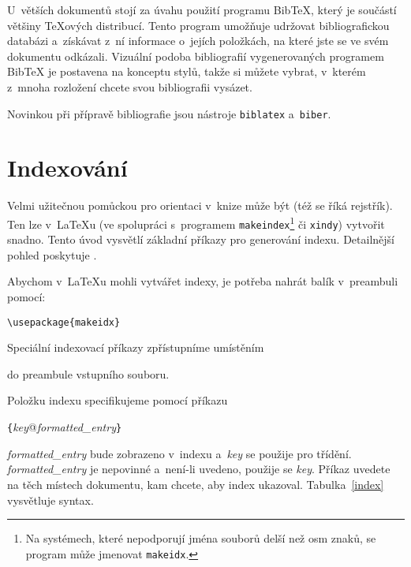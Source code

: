 \def\bibtex{Bib\TeX}
U~větších dokumentů stojí za úvahu použití programu \bibtex, který
je součástí většiny \TeX ových distribucí. Tento program umožňuje
udržovat bibliografickou databázi a~získávat z~ní informace
o~jejích položkách, na které jste se ve svém dokumentu odkázali.
Vizuální podoba bibliografií vygenerovaných programem \bibtex{}
je postavena na konceptu stylů, takže si můžete vybrat, v~kterém
z~mnoha rozložení chcete svou bibliografii vysázet.

Novinkou při přípravě bibliografie jsou nástroje \texttt{biblatex} a~\texttt{biber}.

\newpage

\section{Indexování} \label{sec:indexing}
Velmi užitečnou pomůckou pro orientaci v~knize může být  (též se říká rejstřík).
Ten lze v~\LaTeX u (ve spolupráci s~programem \texttt{makeindex}\footnote
{Na systémech, které nepodporují jména souborů delší než osm znaků,
se program může jmenovat \texttt{makeidx}.} či \texttt{xindy}) vytvořit snadno.
Tento úvod vysvětlí základní příkazy pro generování indexu. Detailnější
pohled poskytuje \companion.

Abychom v~\LaTeX u mohli vytvářet indexy, je potřeba nahrát balík
\mbox{} v~preambuli pomocí:
\begin{lscommand}
\verb|\usepackage{makeidx}|
\end{lscommand}
\noindent Speciální indexovací příkazy zpřístupníme umístěním
\begin{lscommand}
\end{lscommand}
\noindent do preambule vstupního souboru.

Položku indexu specifikujeme pomocí příkazu
\begin{lscommand}
  \verb|{|\emph{key}@\emph{formatted\_entry}\verb|}|
\end{lscommand}
\noindent \emph{formatted\_entry} bude zobrazeno v~indexu 
a~\emph{key} se použije pro třídění. \emph{formatted\_entry} je
nepovinné a~není-li uvedeno, použije se \emph{key}. Příkaz
 uvedete na těch místech dokumentu, kam chcete, aby
index ukazoval. Tabulka~\ref{index} vysvětluje syntax.

